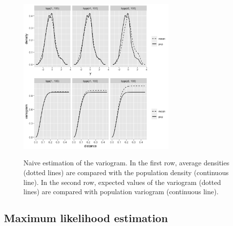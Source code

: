 \begin{figure}[H]
\caption{Naive estimation of the variogram. In the first row, average densities (dotted lines) are compared with the population density (continuous line). In the second row, expected values of the variogram (dotted lines) are compared with population variogram (continuous line).}
\centering
\includegraphics[width=0.7\textwidth]{fig/fig4.png}
\label{fig:sim_naive_est}
\end{figure}



\subsection{Maximum likelihood estimation}


